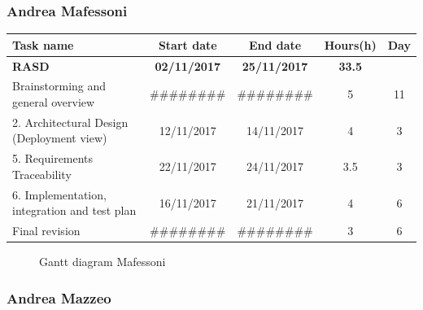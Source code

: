 
\subsubsection{Andrea Mafessoni}

\begin{table}[h!]
	\begin{tabular}{lcccc}
		\toprule
		\textbf{Task name} & \textbf{Start date} & \textbf{End date} & \textbf{Hours(h)} & \textbf{Day} \\
		\midrule
		\textbf{RASD} & \textbf{02/11/2017} & \textbf{25/11/2017} & \textbf{33.5} & \\
		Brainstorming and general overview & \#\#\#\#\#\#\#\# & \#\#\#\#\#\#\#\# & 5 & 11 \\
		2. Architectural Design (Deployment view) & 12/11/2017 & 14/11/2017 & 4 & 3 \\
		5. Requirements Traceability & 22/11/2017 & 24/11/2017 & 3.5 & 3 \\
		6. Implementation, integration and test plan & 16/11/2017 & 21/11/2017 & 4 & 6 \\
		\bottomrule
		Final revision & \#\#\#\#\#\#\#\# & \#\#\#\#\#\#\#\# & 3 & 6 \\
	\end{tabular}
\end{table}

\begin{figure}[!h]
	\centering
	\caption{Gantt diagram Mafessoni}
\end{figure}
\clearpage

\subsubsection{Andrea Mazzeo}

